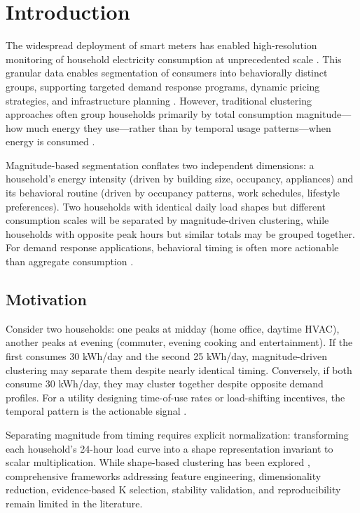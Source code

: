 \documentclass[11pt,a4paper]{article}
\begin{document}
\section{Introduction}
\label{sec:introduction}

The widespread deployment of smart meters has enabled high-resolution monitoring of household electricity consumption at unprecedented scale \cite{lazar2021investigating,kwac2014household}. This granular data enables segmentation of consumers into behaviorally distinct groups, supporting targeted demand response programs, dynamic pricing strategies, and infrastructure planning \cite{yan2021multiple,abdullah2025ml}. However, traditional clustering approaches often group households primarily by total consumption magnitude---how much energy they use---rather than by temporal usage patterns---when energy is consumed \cite{jin2016loadshape,rhodes2014clustering}.

Magnitude-based segmentation conflates two independent dimensions: a household's energy intensity (driven by building size, occupancy, appliances) and its behavioral routine (driven by occupancy patterns, work schedules, lifestyle preferences). Two households with identical daily load shapes but different consumption scales will be separated by magnitude-driven clustering, while households with opposite peak hours but similar totals may be grouped together. For demand response applications, behavioral timing is often more actionable than aggregate consumption \cite{haben2016analysis}.

\subsection{Motivation}

Consider two households: one peaks at midday (home office, daytime HVAC), another peaks at evening (commuter, evening cooking and entertainment). If the first consumes 30 kWh/day and the second 25 kWh/day, magnitude-driven clustering may separate them despite nearly identical timing. Conversely, if both consume 30 kWh/day, they may cluster together despite opposite demand profiles. For a utility designing time-of-use rates or load-shifting incentives, the temporal pattern is the actionable signal \cite{afzalan2020twostage,valdes2021smart}.

Separating magnitude from timing requires explicit normalization: transforming each household's 24-hour load curve into a shape representation invariant to scalar multiplication. While shape-based clustering has been explored \cite{rahayu2021shape,jin2016loadshape}, comprehensive frameworks addressing feature engineering, dimensionality reduction, evidence-based K selection, stability validation, and reproducibility remain limited in the literature.
\end{document}
